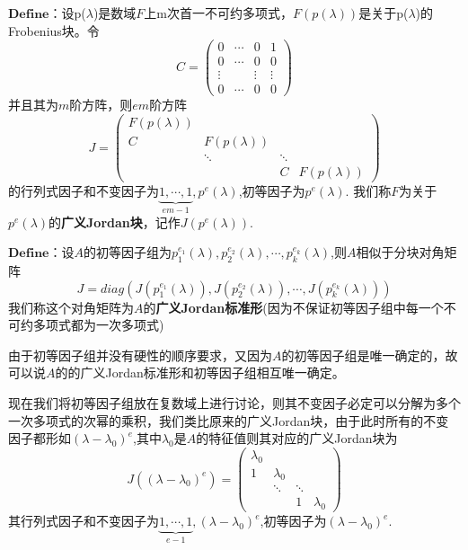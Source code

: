 \documentclass[lang=cn,10pt]{elegantbook}
\begin{document}
$\mathbf{Define}$：设p($\lambda$)是数域$\mathit{F}$上m次首一不可约多项式，$\mathit{F(p(\lambda))}$是关于p($\lambda$)的Frobenius块。令
\begin{equation*}
	C=
	\begin{pmatrix}
		0  & \cdots & 0 & 1 \\
		0 & \cdots &  0&0 \\
		\vdots&  & \vdots &\vdots \\
		0&  \cdots&0  &0
	\end{pmatrix}
\end{equation*}
并且其为$\mathit{m}$阶方阵，则$\mathit{em}$阶方阵
\begin{equation*}
	J=
	\begin{pmatrix}
		F(p(\lambda)) &  &  & \\
		C &  F(p(\lambda))&  & \\
		& \ddots  &\ddots   & \\
		&  & C&F(p(\lambda))
	\end{pmatrix}
\end{equation*}
的行列式因子和不变因子为$\underset{em-1}{\underbrace{1,\cdots ,1} },p^{e}(\lambda)$,初等因子为$p^{e}(\lambda)$.
我们称$\mathit{F}$为关于$p^{e}(\lambda)$的\textbf{广义Jordan块}，记作$\mathit{J(p^{e}(\lambda))}$.

$\mathbf{Define}$：设$\mathit{A}$的初等因子组为$p_{1}^{e_{1}}(\lambda),p_{2}^{e_{2}}(\lambda),\cdots,p_{k}^{e_{k}}(\lambda)$,则$\mathit{A}$相似于分块对角矩阵
\begin{equation*}
	J=diag(J(p_{1}^{e_{1}}(\lambda )),J(p^{e_{2}}_{2}(\lambda )),\cdots,J(p^{e_{k}}_{k}(\lambda )))
\end{equation*}
我们称这个对角矩阵为$\mathit{A}$的\textbf{广义Jordan标准形}(因为不保证初等因子组中每一个不可约多项式都为一次多项式)

由于初等因子组并没有硬性的顺序要求，又因为$\mathit{A}$的初等因子组是唯一确定的，故可以说$\mathit{A}$的的广义Jordan标准形和初等因子组相互唯一确定。

现在我们将初等因子组放在复数域上进行讨论，则其不变因子必定可以分解为多个一次多项式的次幂的乘积，我们类比原来的广义Jordan块，由于此时所有的不变因子都形如$(\lambda-\lambda_{0})^{e}$,其中$\lambda_{0}$是$\mathit{A}$的特征值则其对应的广义Jordan块为
\begin{equation*}
	J((\lambda-\lambda_{0})^{e})=
\begin{pmatrix}
	 \lambda_{0}&  &  & \\
	1&  \lambda_{0}&  & \\
	& \ddots  &\ddots   & \\
	&  & 1&\lambda_{0}
\end{pmatrix}
\end{equation*}
其行列式因子和不变因子为$\underset{e-1}{\underbrace{1,\cdots ,1} },(\lambda-\lambda_{0})^{e}$,初等因子为$(\lambda-\lambda_{0})^{e}$.
\end{document}
